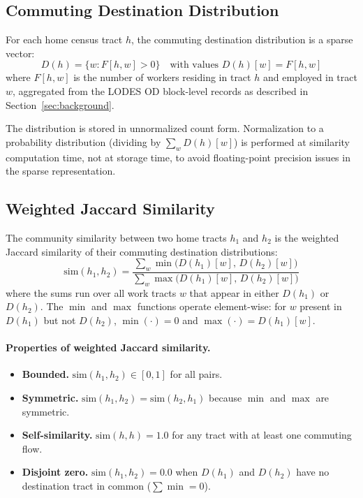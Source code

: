 \label{sec:algorithm}

\subsection{Commuting Destination Distribution}

For each home census tract $h$, the commuting destination distribution
is a sparse vector:
\begin{equation}
  D(h) = \bigl\{ w : F[h, w] > 0 \bigr\}
  \quad\text{with values } D(h)[w] = F[h, w]
  \label{eq:distribution}
\end{equation}
where $F[h, w]$ is the number of workers residing in tract $h$ and employed
in tract $w$, aggregated from the LODES OD block-level records as described
in Section~\ref{sec:background}.

The distribution is stored in unnormalized count form.
Normalization to a probability distribution (dividing by $\sum_w D(h)[w]$)
is performed at similarity computation time, not at storage time,
to avoid floating-point precision issues in the sparse representation.

\subsection{Weighted Jaccard Similarity}

The community similarity between two home tracts $h_1$ and $h_2$ is
the weighted Jaccard similarity of their commuting destination distributions:
\begin{equation}
  \mathrm{sim}(h_1, h_2)
  = \frac{\sum_{w} \min\!\bigl(D(h_1)[w],\, D(h_2)[w]\bigr)}
         {\sum_{w} \max\!\bigl(D(h_1)[w],\, D(h_2)[w]\bigr)}
  \label{eq:jaccard}
\end{equation}
where the sums run over all work tracts $w$ that appear in either $D(h_1)$
or $D(h_2)$.
The $\min$ and $\max$ functions operate element-wise: for $w$ present in
$D(h_1)$ but not $D(h_2)$, $\min(\cdot) = 0$ and $\max(\cdot) = D(h_1)[w]$.

\paragraph{Properties of weighted Jaccard similarity.}
\begin{itemize}
  \item \textbf{Bounded.} $\mathrm{sim}(h_1, h_2) \in [0, 1]$ for all pairs.
  \item \textbf{Symmetric.} $\mathrm{sim}(h_1, h_2) = \mathrm{sim}(h_2, h_1)$
    because $\min$ and $\max$ are symmetric.
  \item \textbf{Self-similarity.} $\mathrm{sim}(h, h) = 1.0$ for any tract with
    at least one commuting flow.
  \item \textbf{Disjoint zero.} $\mathrm{sim}(h_1, h_2) = 0.0$ when $D(h_1)$ and
    $D(h_2)$ have no destination tract in common ($\sum \min = 0$).
\end{itemize}

